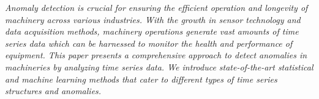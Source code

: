 \documentclass[12 pt ,a4 paper , twoside, openright]{book}
\newcommand{\fncyblank}{\fancyhf{}}
\newenvironment {abstract}%
{\cleardoublepage \fncyblank \null \begin{center}%
	\bfseries \abstractname \end{center}}%
{ \null }
\newcommand{\fncyfront}{%
	\fancyfoot[RO]{}
	\fancyfoot[LE]{}
	\fancyhead[RE,LO]{}
	\fancyfoot[C]{}
	\renewcommand{\footrulewidth}{0.3pt}
}
\newcommand{\fncymain}{%
	\fancyhead[RO]{{\footnotesize\MakeUppercase
			\rightmark}}
	\fancyfoot[RO]{\thepage}
	\fancyhead[LE]{{\footnotesize\MakeUppercase
			\leftmark}}
	\fancyfoot[LE]{\thepage}
	\fancyfoot[C]{}
	\renewcommand{\headrulewidth}{0.1pt}
	\renewcommand{\footrulewidth}{0.1pt}
}
\numberwithin{equation}{chapter}
\theoremstyle{plain}
\theoremstyle{definition}
\begin{document}
\fncyfront
\frontmatter %



%	
%	
	


\fncymain
\mainmatter %


\begin{abstract}
    \textit{Anomaly detection is crucial for ensuring the efficient operation and longevity of machinery across various industries. With the growth in sensor technology and data acquisition methods, machinery operations generate vast amounts of time series data which can be harnessed to monitor the health and performance of equipment. This paper presents a comprehensive approach to detect anomalies in machineries by analyzing time series data. We introduce state-of-the-art statistical and machine learning methods that cater to different types of time series structures and anomalies.}
\end{abstract}

\tableofcontents





\end{document}
